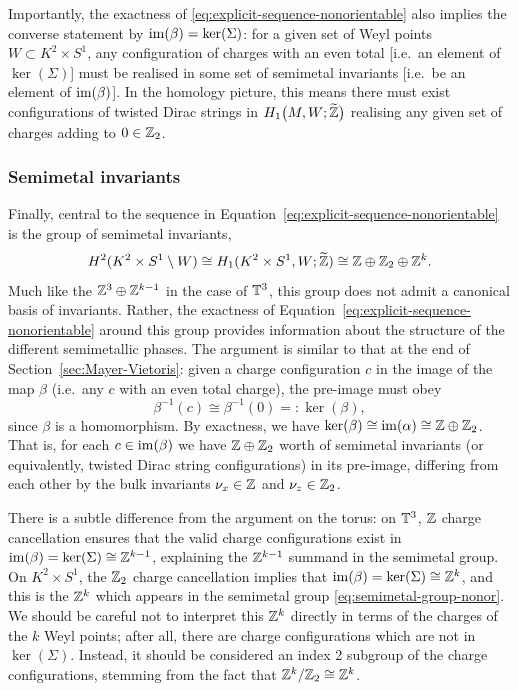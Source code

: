 Importantly, the exactness of \eqref{eq:explicit-sequence-nonorientable} also implies the converse statement by $\operatorname{im}(\beta) = \ker(\Sigma)$: for a given set of Weyl points $W\subset K^2\times S^1$, any configuration of charges with an even total [i.e.\ an element of $\ker(\Sigma)$] must be realised in some set of semimetal invariants [i.e.\ be an element of $\operatorname{im}(\beta)$]. In the homology picture, this means there must exist configurations of twisted Dirac strings in $H_1\big(M, W;\widetilde{\mathbb{Z}}\big)$ realising any given set of charges adding to $0\in\mathbb{Z}_2$.

\subsubsection{Semimetal invariants}

Finally, central to the sequence in Equation~\eqref{eq:explicit-sequence-nonorientable} is the group of semimetal invariants,
\begin{equation}\label{eq:semimetal-group-nonor}
	H^2(K^2\times S^1\setminus W)\cong H_1(K^2\times S^1, W; \widetilde{\mathbb{Z}})\cong \mathbb{Z}\oplus\mathbb{Z}_2\oplus\mathbb{Z}^k.
\end{equation}
Much like the $\mathbb{Z}^3\oplus\mathbb{Z}^{k-1}$ in the case of $\mathbb{T}^3$, this group does not admit a canonical basis of invariants. Rather, the exactness of Equation~\eqref{eq:explicit-sequence-nonorientable} around this group provides information about the structure of the different semimetallic phases. The argument is similar to that at the end of Section~\ref{sec:Mayer-Vietoris}: given a charge configuration $c$ in the image of the map $\beta$ (i.e.\ any $c$ with an even total charge), the pre-image must obey
\begin{equation*}
	\beta^{-1}(c) \cong \beta^{-1}(0) =: \ker(\beta),
\end{equation*}
since $\beta$ is a homomorphism. By exactness, we have $\ker(\beta)\cong\operatorname{im}(\alpha)\cong\mathbb{Z}\oplus\mathbb{Z}_2$. That is, for each $c\in\operatorname{im}(\beta)$ we have $\mathbb{Z}\oplus\mathbb{Z}_2$ worth of semimetal invariants (or equivalently, twisted Dirac string configurations) in its pre-image, differing from each other by the bulk invariants $\nu_x\in\mathbb{Z}$ and $\nu_z\in\mathbb{Z}_2$.

There is a subtle difference from the argument on the torus: on $\mathbb{T}^3$, $\mathbb{Z}$ charge cancellation ensures that the valid charge configurations exist in $\operatorname{im}(\beta)=\ker(\Sigma)\cong\mathbb{Z}^{k-1}$, explaining the $\mathbb{Z}^{k-1}$ summand in the semimetal group. On $K^2\times S^1$, the $\mathbb{Z}_2$ charge cancellation implies that $\operatorname{im}(\beta)=\ker(\Sigma)\cong\mathbb{Z}^k$, and this is the $\mathbb{Z}^k$ which appears in the semimetal group \eqref{eq:semimetal-group-nonor}. We should be careful not to interpret this $\mathbb{Z}^k$ directly in terms of the charges of the $k$ Weyl points; after all, there are charge configurations which are not in $\ker(\Sigma)$. Instead, it should be considered an index 2 subgroup of the charge configurations, stemming from the fact that $\mathbb{Z}^k/\mathbb{Z}_2\cong\mathbb{Z}^k$.


